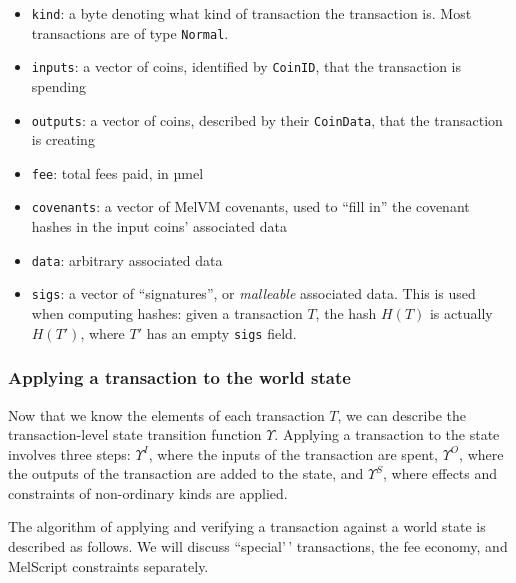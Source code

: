 \documentclass[
]{article}
\newcommand{\passthrough}[1]{#1}
\providecommand{\tightlist}{%
  \setlength{\itemsep}{0pt}\setlength{\parskip}{0pt}}
\begin{document}
\begin{itemize}
  \tightlist
  \item
        \passthrough{\lstinline!kind!}: a byte denoting what kind of
        transaction the transaction is. Most transactions are of type
        \passthrough{\lstinline!Normal!}.
  \item
        \passthrough{\lstinline!inputs!}: a vector of coins, identified by
        \passthrough{\lstinline!CoinID!}, that the transaction is spending
  \item
        \passthrough{\lstinline!outputs!}: a vector of coins, described by
        their \passthrough{\lstinline!CoinData!}, that the transaction is
        creating
  \item
        \passthrough{\lstinline!fee!}: total fees paid, in µmel
  \item
        \passthrough{\lstinline!covenants!}: a vector of MelVM covenants, used
        to ``fill in'' the covenant hashes in the input coins' associated data
  \item
        \passthrough{\lstinline!data!}: arbitrary associated data
  \item
        \passthrough{\lstinline!sigs!}: a vector of ``signatures'', or
        \emph{malleable} associated data. This is used when computing hashes:
        given a transaction \(T\), the hash \(H(T)\) is actually \(H(T')\),
        where \(T'\) has an empty \passthrough{\lstinline!sigs!} field.
\end{itemize}

\hypertarget{applying-a-transaction-to-the-world-state}{%
  \subsubsection{Applying a transaction to the world
    state}\label{applying-a-transaction-to-the-world-state}}

Now that we know the elements of each transaction \(T\), we can describe
the transaction-level state transition function \(\Upsilon\). Applying a
transaction to the state involves three steps: \(\Upsilon^I\), where the
inputs of the transaction are spent, \(\Upsilon^O\), where the outputs
of the transaction are added to the state, and \(\Upsilon^S\), where
effects and constraints of non-ordinary kinds are applied.

The algorithm of applying and verifying a transaction against a world
state is described as follows. We will discuss ``special'\,'
transactions, the fee economy, and MelScript constraints separately.
\end{document}
